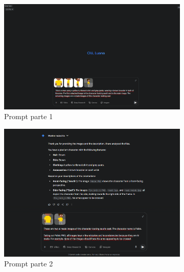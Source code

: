 \begin{figure}[htbp]
    \centering
    \caption{\small Processo da geração 10 do sprite em side view no Gemini Pro em julho/2025}
    \label{fig:geminiPro10}

    \begin{subfigure}{0.45\linewidth}
        \includegraphics[width=1\linewidth]{figs/geminiPro/chat4/tela1.PNG}
        \caption{\small Prompt parte 1}
        \label{fig:geminiPro10Prompt1}
    \end{subfigure}
    \begin{subfigure}{0.45\linewidth}
        \includegraphics[width=1\linewidth]{figs/geminiPro/chat4/tela2.PNG}
        \caption{\small Prompt parte 2}
        \label{fig:geminiPro10Prompt2}
    \end{subfigure}
    \begin{subfigure}{0.8\linewidth}

\end{subfigure}
\end{figure}
